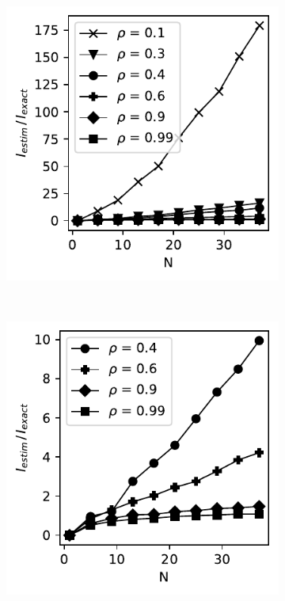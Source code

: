 \documentclass[../Thesis.tex]{subfiles}
\begin{document}
\begin{figure}[H]
    \centering
    \begin{subfigure}[t]{0.32\textwidth}
        \centering
        \includegraphics[width=\linewidth]{figures/ND examples/MI calc/gaussian example original all.pdf}
        \caption{}
        \label{subfig:d}
    \end{subfigure}%
    ~
    \begin{subfigure}[t]{0.32\textwidth}
        \centering
        \includegraphics[width=\linewidth]{figures/ND examples/MI calc/gaussian example original zoom.pdf}

\end{subfigure}
\end{figure}
\end{document}
